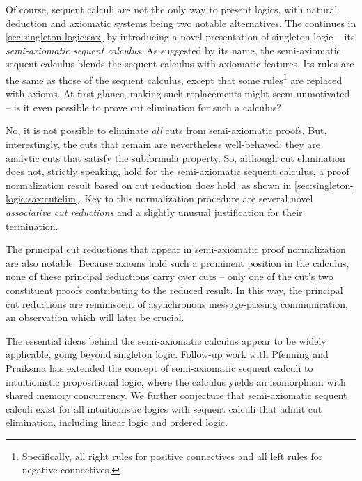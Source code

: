 Of course, sequent calculi are not the only way to present logics, with natural deduction and axiomatic systems being two notable alternatives.
The  continues in \cref{sec:singleton-logic:sax} by introducing a novel presentation of singleton logic -- its \emph{semi-axiomatic sequent calculus}.
As suggested by its name, the semi-axiomatic sequent calculus blends the sequent calculus with axiomatic features.
Its rules are the same as those of the sequent calculus, except that some rules\footnote{Specifically, all right rules for positive connectives and all left rules for negative connectives.} are replaced with axioms.
At first glance, making such replacements might seem unmotivated --
is it even possible to prove cut elimination for such a calculus?

No, it is not possible to eliminate \emph{all} cuts from semi-axiomatic proofs.
But, interestingly, the cuts that remain are nevertheless well-behaved: they are analytic cuts that satisfy the subformula property.
So, although cut elimination does not, strictly speaking, hold for the semi-axiomatic sequent calculus, a proof normalization result based on cut reduction does hold, as shown in \cref{sec:singleton-logic:sax:cutelim}.
Key to this normalization procedure are several novel \emph{associative cut reductions} and a slightly unusual justification for their termination.

The principal cut reductions that appear in semi-axiomatic proof normalization are also notable.
Because axioms hold such a prominent position in the calculus, none of these principal reductions carry over cuts -- only one of the cut's two constituent proofs contributing to the reduced result.
In this way, the principal cut reductions are reminiscent of asynchronous message-passing communication, an observation which will later be crucial.

The essential ideas behind the semi-axiomatic calculus appear to be widely applicable, going beyond singleton logic.
Follow-up work with Pfenning and Pruiksma has extended the concept of semi-axiomatic sequent calculi to intuitionistic propositional logic, where the calculus yields an isomorphism with shared memory concurrency\autocite{DeYoung+:FSCD20}.
We further conjecture that semi-axiomatic sequent calculi exist for all intuitionistic logics with sequent calculi that admit cut elimination, including linear logic and ordered logic.



